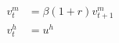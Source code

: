   \begin{align}
    v_t^m &= \beta(1+r)v_{t+1}^m \label{eq:env_m} \\
    v_t^h &= u^h \label{eq:env_h}
  \end{align}
